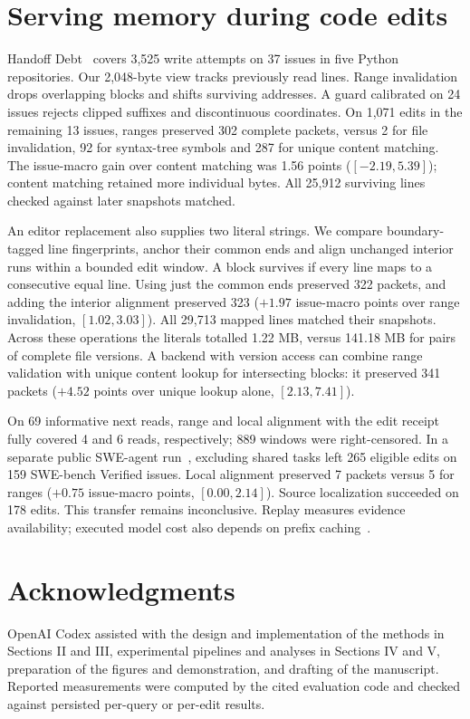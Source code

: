 \documentclass[conference]{IEEEtran}
\begin{document}
\section{Serving memory during code edits}
Handoff Debt~\cite{handoff} covers 3,525 write attempts on 37 issues in five Python repositories. Our 2,048-byte view tracks previously read lines. Range invalidation drops overlapping blocks and shifts surviving addresses. A guard calibrated on 24 issues rejects clipped suffixes and discontinuous coordinates. On 1,071 edits in the remaining 13 issues, ranges preserved 302 complete packets, versus 2 for file invalidation, 92 for syntax-tree symbols and 287 for unique content matching. The issue-macro gain over content matching was 1.56 points ($[-2.19,5.39]$); content matching retained more individual bytes. All 25,912 surviving lines checked against later snapshots matched.

An editor replacement also supplies two literal strings. We compare boundary-tagged line fingerprints, anchor their common ends and align unchanged interior runs within a bounded edit window. A block survives if every line maps to a consecutive equal line. Using just the common ends preserved 322 packets, and adding the interior alignment preserved 323 ($+1.97$ issue-macro points over range invalidation, $[1.02,3.03]$). All 29,713 mapped lines matched their snapshots. Across these operations the literals totalled 1.22 MB, versus 141.18 MB for pairs of complete file versions. A backend with version access can combine range validation with unique content lookup for intersecting blocks: it preserved 341 packets ($+4.52$ points over unique lookup alone, $[2.13,7.41]$).

On 69 informative next reads, range and local alignment with the edit receipt fully covered 4 and 6 reads, respectively; 889 windows were right-censored. In a separate public SWE-agent run~\cite{swe-run}, excluding shared tasks left 265 eligible edits on 159 SWE-bench Verified issues. Local alignment preserved 7 packets versus 5 for ranges ($+0.75$ issue-macro points, $[0.00,2.14]$). Source localization succeeded on 178 edits. This transfer remains inconclusive. Replay measures evidence availability; executed model cost also depends on prefix caching~\cite{physical}.



\section*{Acknowledgments}
OpenAI Codex assisted with the design and implementation of the methods in Sections II and III, experimental pipelines and analyses in Sections IV and V, preparation of the figures and demonstration, and drafting of the manuscript. Reported measurements were computed by the cited evaluation code and checked against persisted per-query or per-edit results.



\end{document}
